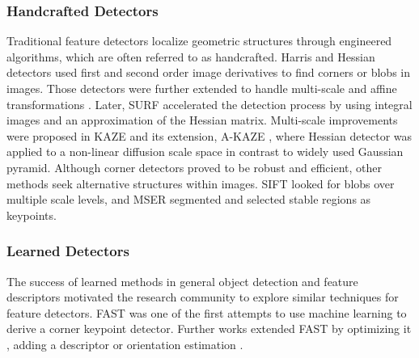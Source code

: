 
\subsubsection{Handcrafted Detectors}
Traditional feature detectors localize geometric structures through engineered algorithms, which are often referred to as handcrafted. Harris \cite{Harris} and Hessian \cite{Hessian} detectors used first and second order image derivatives to find corners or blobs in images. Those detectors were further extended to handle multi-scale and affine transformations \cite{mikolajczykIJCV2004, comparasionofdetector}. Later, SURF \cite{SURF} accelerated the detection process by using integral images and an approximation of the Hessian matrix. Multi-scale improvements were proposed in KAZE \cite{KAZE} and its extension, A-KAZE \cite{AKAZE}, where Hessian detector was applied to a non-linear diffusion scale space in contrast to widely used Gaussian pyramid. Although corner detectors proved to be robust and efficient, other methods seek alternative structures within images. SIFT \cite{SIFT} looked for blobs over multiple scale levels, 
and MSER \cite{MSER} segmented and selected stable regions as keypoints.


\subsubsection{Learned Detectors}
The success of learned methods in general object detection and feature descriptors motivated the research community to explore similar techniques for feature detectors. 
FAST \cite{FAST} was one of the first attempts to use machine learning to derive a corner keypoint detector. Further works extended FAST by optimizing it \cite{FASTER}, adding a descriptor \cite{BRISK} or orientation estimation \cite{ORB}. 

